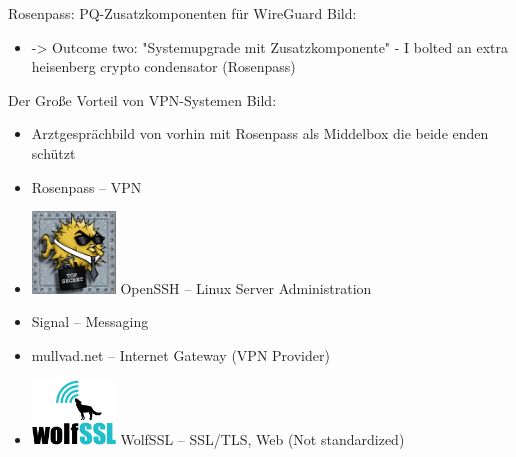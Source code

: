 
\begin{frame}[T]{Rosenpass: PQ-Zusatzkomponenten für WireGuard}
Bild:
\begin{itemize}
  \item -> Outcome two: "Systemupgrade mit Zusatzkomponente"
    - I bolted an extra heisenberg crypto condensator (Rosenpass)
\end{itemize}
\end{frame}

\begin{frame}[T]{Der Große Vorteil von VPN-Systemen}
Bild:
\begin{itemize}
  \item Arztgesprächbild von vorhin mit Rosenpass als Middelbox die beide enden schützt
\end{itemize}
\end{frame}

\begin{frame}[T]{}
\begin{itemize}
  \item
    Rosenpass – VPN
  \item 
    \includegraphics[width=6em]{graphics/logos/OpenSSH_logo.png}
    OpenSSH – Linux Server Administration
  \item 
    Signal – Messaging
  \item
    mullvad.net – Internet Gateway (VPN Provider)
  \item
    \includegraphics[width=6em]{graphics/logos/wolfssl_logo_300px.png}
    WolfSSL – SSL/TLS, Web (Not standardized)
\end{itemize}
\end{frame}
